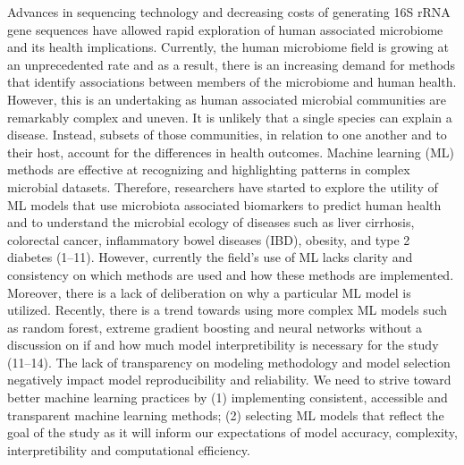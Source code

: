\documentclass[11pt,]{article}
\begin{document}
Advances in sequencing technology and decreasing costs of generating 16S
rRNA gene sequences have allowed rapid exploration of human associated
microbiome and its health implications. Currently, the human microbiome
field is growing at an unprecedented rate and as a result, there is an
increasing demand for methods that identify associations between members
of the microbiome and human health. However, this is an undertaking as
human associated microbial communities are remarkably complex and
uneven. It is unlikely that a single species can explain a disease.
Instead, subsets of those communities, in relation to one another and to
their host, account for the differences in health outcomes. Machine
learning (ML) methods are effective at recognizing and highlighting
patterns in complex microbial datasets. Therefore, researchers have
started to explore the utility of ML models that use microbiota
associated biomarkers to predict human health and to understand the
microbial ecology of diseases such as liver cirrhosis, colorectal
cancer, inflammatory bowel diseases (IBD), obesity, and type 2 diabetes
(1--11). However, currently the field's use of ML lacks clarity and
consistency on which methods are used and how these methods are
implemented. Moreover, there is a lack of deliberation on why a
particular ML model is utilized. Recently, there is a trend towards
using more complex ML models such as random forest, extreme gradient
boosting and neural networks without a discussion on if and how much
model interpretibility is necessary for the study (11--14). The lack of
transparency on modeling methodology and model selection negatively
impact model reproducibility and reliability. We need to strive toward
better machine learning practices by (1) implementing consistent,
accessible and transparent machine learning methods; (2) selecting ML
models that reflect the goal of the study as it will inform our
expectations of model accuracy, complexity, interpretibility and
computational efficiency.
\end{document}
